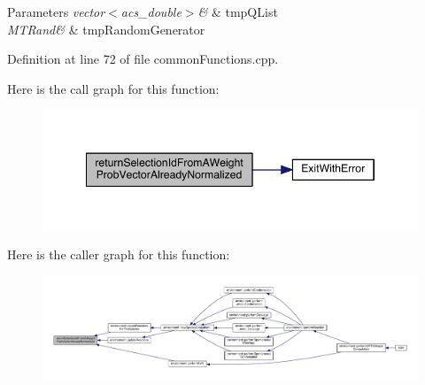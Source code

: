 \begin{DoxyParams}{Parameters}
{\em vector$<$acs\-\_\-double$>$\&} & tmp\-Q\-List \\
\hline
{\em M\-T\-Rand\&} & tmp\-Random\-Generator \\
\hline
\end{DoxyParams}


Definition at line 72 of file common\-Functions.\-cpp.



Here is the call graph for this function\-:
\nopagebreak
\begin{figure}[H]
\begin{center}
\leavevmode
\includegraphics[width=346pt]{a00076_a4135ff15fd24eb8fbfee3d00e1cfbf20_cgraph}
\end{center}
\end{figure}




Here is the caller graph for this function\-:
\nopagebreak
\begin{figure}[H]
\begin{center}
\leavevmode
\includegraphics[width=350pt]{a00076_a4135ff15fd24eb8fbfee3d00e1cfbf20_icgraph}
\end{center}
\end{figure}


